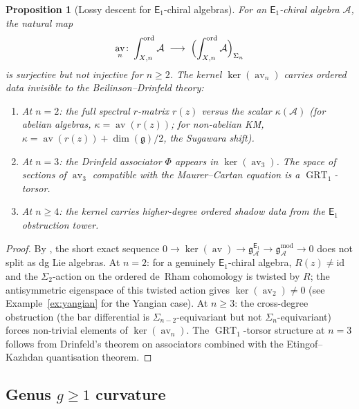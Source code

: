\documentclass[11pt,reqno]{amsart}
\newtheorem{proposition}[theorem]{Proposition}
\theoremstyle{definition}
\theoremstyle{remark}
\newcommand{\cA}{\mathcal{A}}
\newcommand{\Eone}{\mathsf{E}_{1}}
\DeclareMathOperator{\av}{av}
\DeclareMathOperator{\GRT}{GRT}
\newcommand{\fg}{\mathfrak{g}}
\newcommand{\gmod}{\mathfrak{g}^{\mathrm{mod}}_{\cA}}
\newcommand{\gEone}{\mathfrak{g}^{\Eone}_{\cA}}
\newcommand{\id}{\mathrm{id}}
\numberwithin{equation}{section}
\begin{document}
\begin{proposition}[Lossy descent for $\Eone$-chiral algebras]
\label{prop:lossy-descent}
For an $\Eone$-chiral algebra $\cA$, the natural map
\begin{equation}\label{eq:lossy}
  \av_n \colon
  \int_{X,n}^{\mathrm{ord}} \cA
  \;\longrightarrow\;
  \Bigl(\int_{X,n}^{\mathrm{ord}} \cA\Bigr)_{\Sigma_n}
\end{equation}
is surjective but not injective for $n \geq 2$. The kernel
$\ker(\av_n)$ carries ordered data invisible to the
Beilinson--Drinfeld theory:
\begin{enumerate}[label=\textup{(\roman*)}]
\item At $n = 2$: the full spectral $r$-matrix $r(z)$
  versus the scalar $\kappa(\cA)$
  (for abelian algebras, $\kappa = \av(r(z))$;
  for non-abelian KM, $\kappa = \av(r(z)) + \dim(\fg)/2$,
  the Sugawara shift).
\item At $n = 3$: the Drinfeld associator $\Phi$ appears
  in $\ker(\av_3)$. The space of sections of $\av_3$
  compatible with the Maurer--Cartan equation is a
  $\GRT_1$-torsor.
\item At $n \geq 4$: the kernel carries higher-degree
  ordered shadow data from the $\Eone$ obstruction
  tower.
\end{enumerate}
\end{proposition}

\begin{proof}
By \cite[the non-splitting proposition]{Lorgat26I},
the short exact sequence
$0 \to \ker(\av) \to \gEone \to \gmod \to 0$
does not split as dg Lie algebras.
At $n = 2$: for a genuinely $\Eone$-chiral algebra,
$R(z) \neq \id$ and the $\Sigma_2$-action on the
ordered de~Rham cohomology is twisted by $R$; the
antisymmetric eigenspace of this twisted action gives
$\ker(\av_2) \neq 0$
(see Example~\ref{ex:yangian} for the Yangian
case). At $n \geq 3$: the cross-degree
obstruction (the bar differential is
$\Sigma_{n-2}$-equivariant but not
$\Sigma_n$-equivariant) forces non-trivial elements
of $\ker(\av_n)$. The $\GRT_1$-torsor
structure at $n = 3$ follows from Drinfeld's theorem
on associators combined with the Etingof--Kazhdan
quantisation theorem.
\end{proof}


\subsection{Genus $g \geq 1$ curvature}
\label{subsec:genus-curvature}
\end{document}

